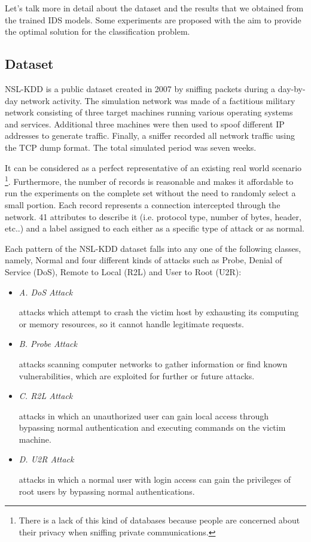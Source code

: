 \documentclass[twocolumn,11pt]{asme2ej}
\begin{document}
Let's talk more in detail about the dataset and the results that we obtained from the trained IDS models. Some experiments are proposed with the aim to provide the optimal solution for the classification problem.

\subsection{Dataset}

NSL-KDD is a public dataset created in 2007 by sniffing packets during a day-by-day network activity. The simulation network was made of a factitious military network consisting of three target machines running various operating systems and services. Additional three machines were then used to spoof different IP addresses to generate traffic. Finally, a sniffer recorded all network traffic using the TCP dump format. The total simulated period was seven weeks.

It can be considered as a perfect representative of an existing real world scenario \footnote{There is a lack of this kind of databases because people are concerned about their privacy when sniffing private communications.}. Furthermore, the number of records is reasonable and makes it affordable to run the experiments on the complete set without the need to randomly select a small portion. Each record represents a connection intercepted through the network. 41 attributes to describe it (i.e. protocol type, number of bytes, header, etc..) and a label assigned to each either as a specific type of attack or as normal.

Each pattern of the NSL-KDD dataset falls into any one of the following classes, namely, Normal and four different kinds of attacks such as Probe, Denial of Service (DoS), Remote to Local (R2L) and User to Root (U2R):
\begin{itemize}
\item \textit{A. DoS Attack}

attacks which attempt to crash the victim host by exhausting its computing or memory resources, so it cannot handle legitimate requests.\\

\item \textit{B. Probe Attack}

attacks scanning computer networks to gather information or find known vulnerabilities, which are exploited for further or future attacks.\\

\item \textit{C. R2L Attack}

attacks in which an unauthorized user can gain local access through bypassing normal authentication and executing commands on the victim machine.\\

\item \textit{D. U2R Attack}

attacks in which a normal user with login access can gain the privileges of root users by bypassing normal authentications.\\

\end{itemize}
\end{document}

